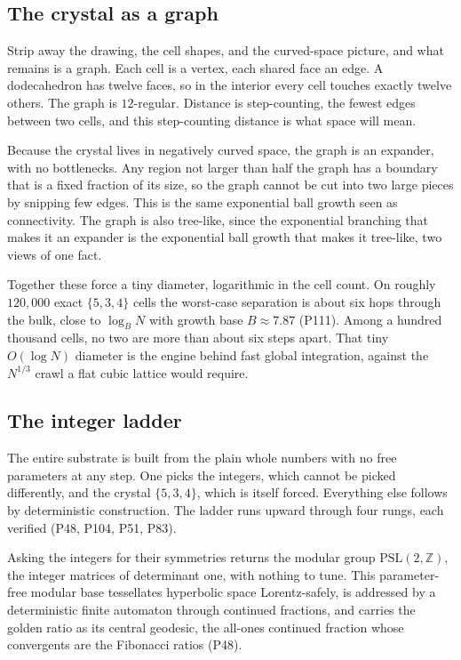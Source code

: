 \subsection{The crystal as a graph}

Strip away the drawing, the cell shapes, and the curved-space picture, and what remains is a graph. Each cell
is a vertex, each shared face an edge. A dodecahedron has twelve faces, so in the interior every cell touches
exactly twelve others. The graph is $12$-regular. Distance is step-counting, the fewest edges between two
cells, and this step-counting distance is what space will mean.

Because the crystal lives in negatively
curved space, the graph is an expander, with no bottlenecks. Any region not larger than half the graph has a
boundary that is a fixed fraction of its size, so the graph cannot be cut into two large pieces by snipping
few edges. This is the same exponential ball growth seen as connectivity. The graph is also tree-like, since
the exponential branching that makes it an expander is the exponential ball growth that makes it tree-like,
two views of one fact.

Together these force a tiny diameter, logarithmic in the cell count. On roughly
$120{,}000$ exact $\{5,3,4\}$ cells the worst-case separation is about six hops through the bulk, close to
$\log_B N$ with growth base $B \approx 7.87$ (P111). Among a hundred thousand cells, no two are more than
about six steps apart. That tiny $O(\log N)$ diameter is the engine behind fast global integration, against
the $N^{1/3}$ crawl a flat cubic lattice would require.

\subsection{The integer ladder}

The entire substrate is built from the plain whole numbers with no free parameters at any step. One picks the
integers, which cannot be picked differently, and the crystal $\{5,3,4\}$, which is itself forced. Everything
else follows by deterministic construction. The ladder runs upward through four rungs, each verified (P48,
P104, P51, P83).

Asking the integers for their symmetries returns the modular group $\mathrm{PSL}(2,\mathbb{Z})$,
the integer matrices of determinant one, with nothing to tune. This parameter-free modular base tessellates
hyperbolic space Lorentz-safely, is addressed by a deterministic finite automaton through continued
fractions, and carries the golden ratio as its central geodesic, the all-ones continued fraction whose
convergents are the Fibonacci ratios (P48).

